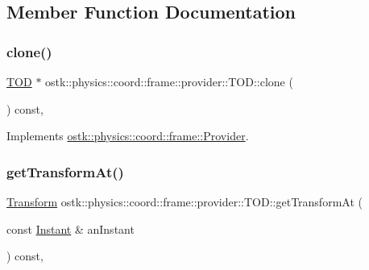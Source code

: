\subsection{Member Function Documentation}
\mbox{\label{classostk_1_1physics_1_1coord_1_1frame_1_1provider_1_1_t_o_d_ad374cdce01f5872311b61695502dd4e4}} 
\subsubsection{\texorpdfstring{clone()}{clone()}}
{\footnotesize\ttfamily \hyperlink{classostk_1_1physics_1_1coord_1_1frame_1_1provider_1_1_t_o_d}{T\+OD} $\ast$ ostk\+::physics\+::coord\+::frame\+::provider\+::\+T\+O\+D\+::clone (\begin{DoxyParamCaption}{ }\end{DoxyParamCaption}) const\hspace{0.3cm}{\ttfamily [override]}, {\ttfamily [virtual]}}



Implements \hyperlink{classostk_1_1physics_1_1coord_1_1frame_1_1_provider_ae41bc3862d088e9c8d90a79253294ce9}{ostk\+::physics\+::coord\+::frame\+::\+Provider}.

\mbox{\label{classostk_1_1physics_1_1coord_1_1frame_1_1provider_1_1_t_o_d_adc74a9cba68df62bf135f5ee775bd4a1}} 
\subsubsection{\texorpdfstring{get\+Transform\+At()}{getTransformAt()}}
{\footnotesize\ttfamily \hyperlink{classostk_1_1physics_1_1coord_1_1_transform}{Transform} ostk\+::physics\+::coord\+::frame\+::provider\+::\+T\+O\+D\+::get\+Transform\+At (\begin{DoxyParamCaption}\item[{const \hyperlink{classostk_1_1physics_1_1time_1_1_instant}{Instant} \&}]{an\+Instant }\end{DoxyParamCaption}) const\hspace{0.3cm}{\ttfamily [override]}, {\ttfamily [virtual]}}




